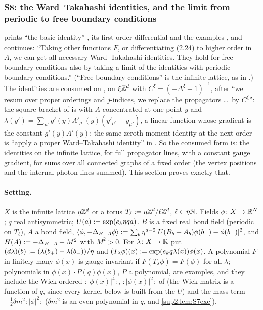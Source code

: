 
\subsubsection{S8: the Ward--Takahashi identities, and the limit from periodic to free boundary conditions}\label{sup2:ssec:S8}

\cite[pp.~430--431]{Ba3} prints ``the basic identity'' \cite[(2.23)]{Ba3}, its first-order differential \cite[(2.24)]{Ba3} and the examples \cite[(2.25)--(2.28)]{Ba3}, and continues: ``Taking other functions $F$, or differentiating (2.24) to higher order in $A$, we can get all necessary Ward--Takahashi identities. They hold for free boundary conditions also by taking a limit of the identities with periodic boundary conditions.'' (``Free boundary conditions'' is the infinite lattice, as in \cite[p.~584]{Ba4}.) The identities are consumed on \cite[pp.~441--442]{Ba3}, on $\xi\mathbb Z^d$ with $C^\xi=(-\Delta^\xi+1)^{-1}$, after ``we resum over proper orderings and $j$-indices, we replace the propagators \dots\ by $C^\xi$'': the square bracket of \cite[(3.29)]{Ba3} is \cite[(2.26)]{Ba3} with $A$ concentrated at one point $y$ and $\lambda(y')=\sum_{\mu'}g'(y)A'_{\mu'}(y)(y'_{\mu'}-y_{\mu'})$, a linear function whose gradient is the constant $g'(y)A'(y)$; the same zeroth-moment identity at the next order is ``apply a proper Ward--Takahashi identity'' in \cite[(3.31)--(3.32)]{Ba3}. So the consumed form is: the identities on the infinite lattice, for full propagator lines, with a constant gauge gradient, for sums over all connected graphs of a fixed order (the vertex positions and the internal photon lines summed). This section proves exactly that.

\paragraph{Setting.} $X$ is the infinite lattice $\eta\mathbb Z^d$ or a torus $T_\ell:=\eta\mathbb Z^d/\ell\mathbb Z^d$, $\ell\in\eta\mathbb N$. Fields $\phi\colon X\to\mathbb R^N$; $q$ real antisymmetric; $U(a):=\exp(e_k\eta qa)$. $B$ is a fixed real bond field (periodic on $T_\ell$), $A$ a bond field, $\langle\phi,-\Delta_{B+A}\phi\rangle:=\sum_b\eta^{d-2}|U(B_b+A_b)\phi(b_+)-\phi(b_-)|^2$, and $H(A):=-\Delta_{B+A}+M^2$ with $M^2>0$. For $\lambda\colon X\to\mathbb R$ put $(d\lambda)(b):=(\lambda(b_+)-\lambda(b_-))/\eta$ and $(T_\lambda\phi)(x):=\exp(e_kq\lambda(x))\phi(x)$. A polynomial $F$ in finitely many $\phi(x)$ is gauge invariant if $F(T_\lambda\phi)=F(\phi)$ for all $\lambda$; polynomials in $\phi(x)\cdot P(q)\phi(x)$, $P$ a polynomial, are examples, and they include the Wick-ordered $:\!|\phi(x)|^4\!:$, $:\!|\phi(x)|^2\!:$ of \cite[(2.24)--(2.28)]{Ba3} (the Wick matrix is a function of $q$, since every kernel below is built from the $U$) and the mass term $-\frac12\delta m^2:\!|\phi|^2\!:$ ($\delta m^2$ is an even polynomial in $q$, \cite[(1.23)]{Ba3} and \cref{sup2:lem:S7exc}).


